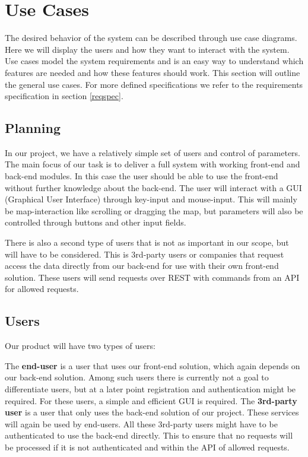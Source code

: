 \documentclass[11pt,a4paper,titlepage,oneside]{report}
\begin{document}
\section{Use Cases}
The desired behavior of the system can be described through use case diagrams. Here we will display the users and how they want to interact with the system. Use cases model the system requirements and is an easy way to understand which features are needed and how these features should work. This section will outline the general use cases. For more defined specifications we refer to the requirements specification in section \ref{reqspec}.

  \subsection{Planning}
  In our project, we have a relatively simple set of users and control of parameters. The main focus of our task is to deliver a full system with working front-end and back-end modules. In this case the user should be able to use the front-end without further knowledge about the back-end. The user will interact with a GUI (Graphical User Interface) through key-input and mouse-input. This will mainly be map-interaction like scrolling or dragging the map, but parameters will also be controlled through buttons and other input fields.

  There is also a second type of users that is not as important in our scope, but will have to be considered. This is 3rd-party users or companies that request access the data directly from our back-end for use with their own front-end solution. These users will send requests over REST with commands from an API for allowed requests.

  \subsection{Users}
  Our product will have two types of users:
  
  The \textbf{end-user} is a user that uses our front-end solution, which again depends on our back-end solution. Among such users there is currently not a goal to differentiate users, but at a later point registration and authentication might be required. For these users, a simple and efficient GUI is required.  
  The \textbf{3rd-party user} is a user that only uses the back-end solution of our project. These services will again be used by end-users. All these 3rd-party users might have to be authenticated to use the back-end directly. This to ensure that no requests will be processed if it is not authenticated and within the API of allowed requests.
  
\end{document}
